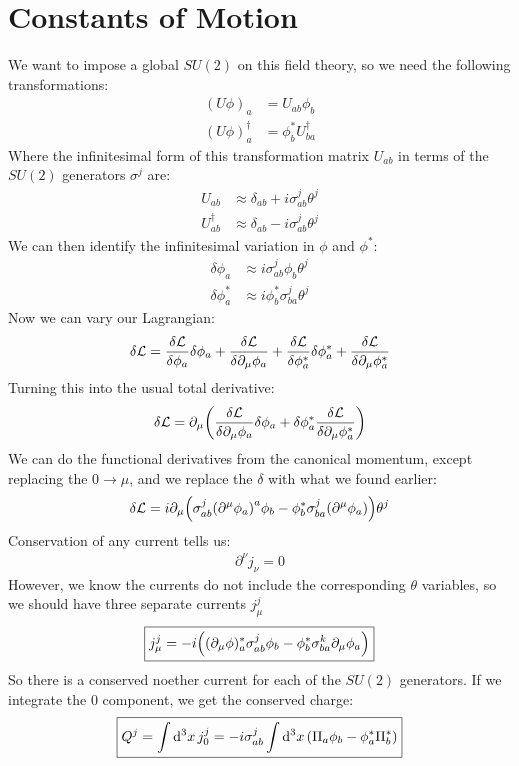 \documentclass[12pt]{article}
\renewcommand{\L}{\mathcal{L}}
\newcommand{\D}{\partial}
\newcommand{\phis}{\phi^*}
\begin{document}
\section{Constants of Motion}
We want to impose a global $SU(2)$ on this field theory, so we need the following transformations:
\begin{align*}
  (U\phi)_a&=U_{ab}\phi_b\\
  (U\phi)^\dag_a&=\phis_bU^\dag_{ba}
\end{align*}
Where the infinitesimal form of this transformation matrix $U_{ab}$ in terms of the $SU(2)$ generators $\sigma^j$ are:
\begin{align*}
  U_{ab}&\approx\delta_{ab}+i\sigma^j_{ab}\theta^j\\
  U^\dag_{ab}&\approx\delta_{ab}-i\sigma^j_{ab}\theta^j
\end{align*}
We can then identify the infinitesimal variation in $\phi$ and $\phis$:
\begin{align*}
  \delta\phi_a&\approx i\sigma^j_{ab}\phi_b\theta^j\\
  \delta\phis_a&\approx i\phis_b\sigma^j_{ba}\theta^j
\end{align*}
Now we can vary our Lagrangian:
\begin{align*}
  \delta\L=\fdv{\L}{\phi_a}\delta\phi_a+\fdv{\L}{\D_\mu\phi_a}+
  \fdv{\L}{\phis_a}\delta\phis_a+\fdv{\L}{\D_\mu\phis_a}
\end{align*}
Turning this into the usual total derivative:
\begin{align*}
  \delta\L=\D_\mu\qty(\fdv{\L}{\D_\mu\phi_a}\delta\phi_a+
  \delta\phis_a\fdv{\L}{\D_\mu\phis_a})
\end{align*}
We can do the functional derivatives from the canonical momentum, except replacing the $0\to\mu$, and we replace the $\delta$ with what we found earlier:
\begin{align*}
  \delta\L=i\D_\mu\qty(\sigma^j_{ab}\qty(\D^\mu\phi_a)^a\phi_b
  -\phis_b\sigma^j_{ba}\qty(\D^\mu\phi_a))\theta^j
\end{align*}
Conservation of any current tells us:
\begin{align*}
  \D^\nu j_\nu=0
\end{align*}
However, we know the currents do not include the corresponding $\theta$ variables, so we should have three separate currents $j_\mu^j$
\begin{align*}
  \boxed{j_\mu^j=-i\qty((\D_\mu\phi)^*_a\sigma^j_{ab}\phi_
  b-\phis_b\sigma^k_{ba}\D_\mu\phi_a)}
\end{align*}
So there is a conserved noether current for each of the $SU(2)$ generators. If we integrate the $0$ component, we get the conserved charge:
\begin{align*}
  \boxed{Q^j=\int\dd[3]{x}j_0^j=-i\sigma^j_{ab}
  \int\dd[3]{x}\qty(\Pi_a\phi_b-\phi^*_a\Pi^*_b)}
\end{align*}
\end{document}
